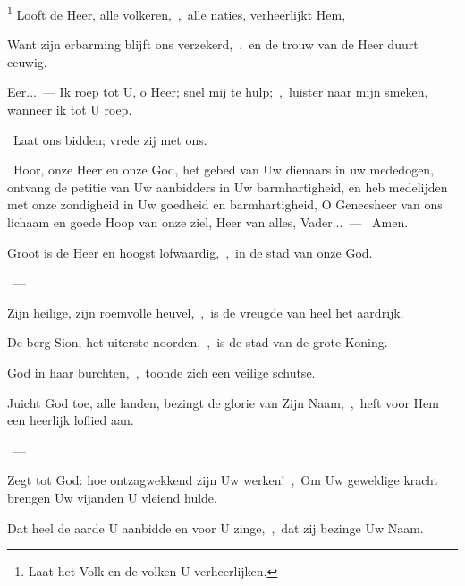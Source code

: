 \documentclass[12pt,twoside,a5paper]{article}
\begin{document}
\begin{halfparskip}
  \footnote{ Laat het Volk en de volken U verheerlijken.} Looft de Heer, alle volkeren,~\sep\ alle naties, verheerlijkt Hem,

  Want zijn erbarming blijft ons verzekerd,~\sep\ en de trouw van de Heer duurt eeuwig.

  Eer...~--- Ik roep tot U, o Heer; snel mij te hulp;~\sep\ luister naar mijn smeken, wanneer ik tot U roep.
\end{halfparskip}

\begin{halfparskip}
  \dd~Laat ons bidden; vrede zij met ons.

  \cc~Hoor, onze Heer en onze God, het gebed van Uw dienaars in uw mededogen, ontvang de petitie van Uw aanbidders in Uw barmhartigheid, en heb medelijden met onze zondigheid in Uw goedheid en barmhartigheid, O Geneesheer van ons lichaam en goede Hoop van onze ziel, Heer van alles, Vader...~--- \rr~Amen.
\end{halfparskip}





\begin{halfparskip}
  Groot is de Heer en hoogst lofwaardig,~\sep\ in de stad van onze God.

  ~--- 

  Zijn heilige, zijn roemvolle heuvel,~\sep\ is de vreugde van heel het aardrijk.

  De berg Sion, het uiterste noorden,~\sep\ is de stad van de grote Koning.

  God in haar burchten,~\sep\ toonde zich een veilige schutse.
\end{halfparskip}


\begin{halfparskip}
  Juicht God toe, alle landen, bezingt de glorie van Zijn Naam,~\sep\ heft voor Hem een heerlijk loflied aan.

  ~--- 

  Zegt tot God: hoe ontzagwekkend zijn Uw werken!~\sep\ Om Uw geweldige kracht brengen Uw vijanden U vleiend hulde.

  Dat heel de aarde U aanbidde en voor U zinge,~\sep\ dat zij bezinge Uw Naam.
\end{halfparskip}
\end{document}
